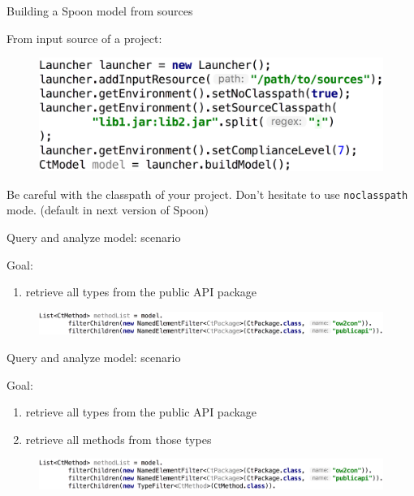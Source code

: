 \documentclass{beamer}
\begin{document}
\begin{frame}[t]{Building a Spoon model from sources}

From input source of a project:
\begin{figure}
\centering
\includegraphics[width=\textwidth]{figures/build/api-launcher.pdf}
\end{figure}

Be careful with the classpath of your project. Don't hesitate to use \texttt{noclasspath} mode. (default in next version of Spoon)
\end{frame}

\begin{frame}[t]{Query and analyze model: scenario}

Goal: 
\begin{enumerate}
\item retrieve all types from the public API package
\end{enumerate}

\begin{figure}
\centering
\includegraphics[width=\textwidth]{figures/queries/query-scenario-1.pdf}
\end{figure}
\end{frame}

\begin{frame}[t]{Query and analyze model: scenario}

Goal:
\begin{enumerate}
\item retrieve all types from the public API package
\item retrieve all methods from those types
\end{enumerate}

\begin{figure}
\centering
\includegraphics[width=\textwidth]{figures/queries/query-scenario-2.pdf}
\end{figure}
\end{frame}
\end{document}
